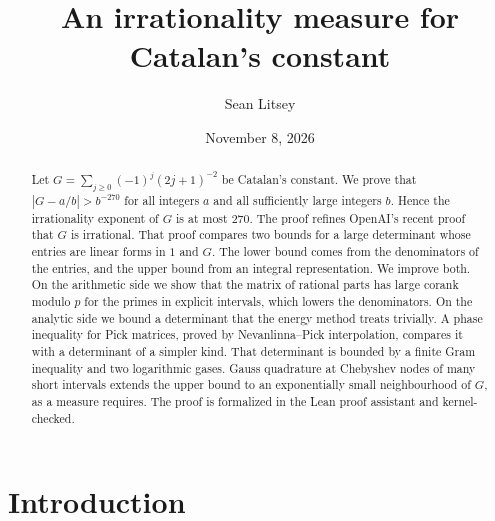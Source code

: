 \documentclass[11pt]{amsart}
\theoremstyle{definition}
\theoremstyle{remark}
\numberwithin{equation}{section}
\begin{document}
\title{An irrationality measure for Catalan's constant}

\author{Sean Litsey}

\date{November 8, 2026}



\begin{abstract}
Let $G=\sum_{j\ge0}(-1)^j(2j+1)^{-2}$ be Catalan's constant. We prove that $|G-a/b|>b^{-270}$ for all
integers $a$ and all sufficiently large integers $b$. Hence the irrationality exponent of $G$ is at most
$270$. The proof refines OpenAI's recent proof that $G$ is irrational. That proof compares two bounds for
a large determinant whose entries are linear forms in $1$ and $G$. The lower bound comes from the
denominators of the entries, and the upper bound from an integral representation. We improve both. On the
arithmetic side we show that the matrix of rational parts has large corank modulo $p$ for the primes in
explicit intervals, which lowers the denominators. On the analytic side we bound a determinant that the
energy method treats trivially. A phase inequality for Pick matrices, proved by Nevanlinna--Pick
interpolation, compares it with a determinant of a simpler kind. That determinant is bounded by a finite
Gram inequality and two logarithmic gases. Gauss quadrature at Chebyshev nodes of many short intervals
extends the upper bound to an exponentially small neighbourhood of $G$, as a measure requires. The proof is formalized in the Lean proof
assistant and kernel-checked.
\end{abstract}

\maketitle

\tableofcontents

\section{Introduction}\label{sec:intro}
\end{document}
